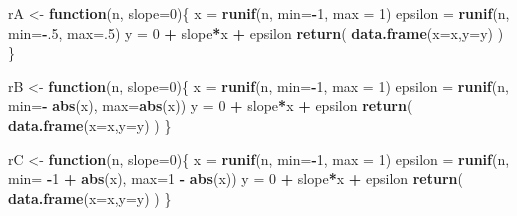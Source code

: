 \documentclass[
]{book}
\newenvironment{Shaded}{\begin{snugshade}}{\end{snugshade}}
\newcommand{\AttributeTok}[1]{\textcolor[rgb]{0.13,0.29,0.53}{#1}}
\newcommand{\ControlFlowTok}[1]{\textcolor[rgb]{0.13,0.29,0.53}{\textbf{#1}}}
\newcommand{\DecValTok}[1]{\textcolor[rgb]{0.00,0.00,0.81}{#1}}
\newcommand{\FunctionTok}[1]{\textcolor[rgb]{0.13,0.29,0.53}{\textbf{#1}}}
\newcommand{\NormalTok}[1]{#1}
\newcommand{\OtherTok}[1]{\textcolor[rgb]{0.56,0.35,0.01}{#1}}
\newcommand{\SpecialCharTok}[1]{\textcolor[rgb]{0.81,0.36,0.00}{\textbf{#1}}}
\theoremstyle{definition}
\theoremstyle{definition}
\theoremstyle{definition}
\theoremstyle{definition}
\theoremstyle{remark}
\begin{document}
\begin{Shaded}
\begin{Highlighting}[]
\NormalTok{rA }\OtherTok{\textless{}{-}} \ControlFlowTok{function}\NormalTok{(n, }\AttributeTok{slope=}\DecValTok{0}\NormalTok{)\{}
\NormalTok{  x       }\OtherTok{=} \FunctionTok{runif}\NormalTok{(n, }\AttributeTok{min=}\SpecialCharTok{{-}}\DecValTok{1}\NormalTok{, }\AttributeTok{max =} \DecValTok{1}\NormalTok{)}
\NormalTok{  epsilon }\OtherTok{=} \FunctionTok{runif}\NormalTok{(n, }\AttributeTok{min=}\SpecialCharTok{{-}}\NormalTok{.}\DecValTok{5}\NormalTok{, }\AttributeTok{max=}\NormalTok{.}\DecValTok{5}\NormalTok{)}
\NormalTok{  y       }\OtherTok{=} \DecValTok{0} \SpecialCharTok{+}\NormalTok{ slope}\SpecialCharTok{*}\NormalTok{x }\SpecialCharTok{+}\NormalTok{ epsilon}
  \FunctionTok{return}\NormalTok{( }\FunctionTok{data.frame}\NormalTok{(}\AttributeTok{x=}\NormalTok{x,}\AttributeTok{y=}\NormalTok{y) )}
\NormalTok{\}}

\NormalTok{rB }\OtherTok{\textless{}{-}} \ControlFlowTok{function}\NormalTok{(n, }\AttributeTok{slope=}\DecValTok{0}\NormalTok{)\{}
\NormalTok{  x       }\OtherTok{=} \FunctionTok{runif}\NormalTok{(n, }\AttributeTok{min=}\SpecialCharTok{{-}}\DecValTok{1}\NormalTok{, }\AttributeTok{max =} \DecValTok{1}\NormalTok{)}
\NormalTok{  epsilon }\OtherTok{=} \FunctionTok{runif}\NormalTok{(n, }\AttributeTok{min=}\SpecialCharTok{{-}} \FunctionTok{abs}\NormalTok{(x), }\AttributeTok{max=}\FunctionTok{abs}\NormalTok{(x))}
\NormalTok{  y       }\OtherTok{=} \DecValTok{0} \SpecialCharTok{+}\NormalTok{ slope}\SpecialCharTok{*}\NormalTok{x }\SpecialCharTok{+}\NormalTok{ epsilon}
  \FunctionTok{return}\NormalTok{( }\FunctionTok{data.frame}\NormalTok{(}\AttributeTok{x=}\NormalTok{x,}\AttributeTok{y=}\NormalTok{y) )}
\NormalTok{\}}

\NormalTok{rC }\OtherTok{\textless{}{-}} \ControlFlowTok{function}\NormalTok{(n, }\AttributeTok{slope=}\DecValTok{0}\NormalTok{)\{}
\NormalTok{  x       }\OtherTok{=} \FunctionTok{runif}\NormalTok{(n, }\AttributeTok{min=}\SpecialCharTok{{-}}\DecValTok{1}\NormalTok{, }\AttributeTok{max =} \DecValTok{1}\NormalTok{)}
\NormalTok{  epsilon }\OtherTok{=} \FunctionTok{runif}\NormalTok{(n, }\AttributeTok{min=} \SpecialCharTok{{-}}\DecValTok{1} \SpecialCharTok{+} \FunctionTok{abs}\NormalTok{(x), }\AttributeTok{max=}\DecValTok{1} \SpecialCharTok{{-}} \FunctionTok{abs}\NormalTok{(x))}
\NormalTok{  y       }\OtherTok{=} \DecValTok{0} \SpecialCharTok{+}\NormalTok{ slope}\SpecialCharTok{*}\NormalTok{x }\SpecialCharTok{+}\NormalTok{ epsilon}
  \FunctionTok{return}\NormalTok{( }\FunctionTok{data.frame}\NormalTok{(}\AttributeTok{x=}\NormalTok{x,}\AttributeTok{y=}\NormalTok{y) )}
\NormalTok{\}}
\end{Highlighting}
\end{Shaded}
\end{document}
